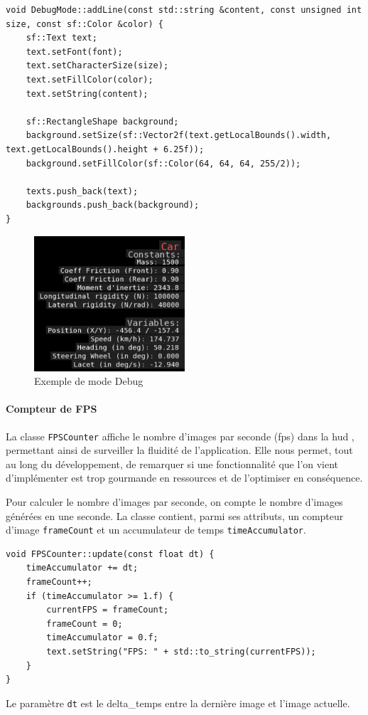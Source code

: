 \begin{lstlisting}[style=CStyle, label={lst:code_addline}]
void DebugMode::addLine(const std::string &content, const unsigned int size, const sf::Color &color) {
    sf::Text text;
    text.setFont(font);
    text.setCharacterSize(size);
    text.setFillColor(color);
    text.setString(content);

    sf::RectangleShape background;
    background.setSize(sf::Vector2f(text.getLocalBounds().width, text.getLocalBounds().height + 6.25f));
    background.setFillColor(sf::Color(64, 64, 64, 255/2));

    texts.push_back(text);
    backgrounds.push_back(background);
}
\end{lstlisting}
\begin{figure}[H]
    \centering
    \includegraphics[width=0.5\textwidth]{resources/example_debug_mode_1}
    \caption{Exemple de mode Debug}
    \label{fig:debug_mode}
\end{figure}

\paragraph{Compteur de FPS}
La classe \texttt{FPSCounter} affiche le nombre d'images par seconde (\gls{fps}) dans la \gls{hud} , permettant ainsi de surveiller la fluidité de l'application.
Elle nous permet, tout au long du développement, de remarquer si une fonctionnalité que l'on vient d'implémenter est trop gourmande en ressources et de l'optimiser en conséquence.

Pour calculer le nombre d'images par seconde, on compte le nombre d'images générées en une seconde.
La classe contient, parmi ses attributs, un compteur d'image \texttt{frameCount} et un accumulateur de temps \texttt{timeAccumulator}.
\begin{lstlisting}[style=CStyle, label={lst:code_fpscounter}]
void FPSCounter::update(const float dt) {
    timeAccumulator += dt;
    frameCount++;
    if (timeAccumulator >= 1.f) {
        currentFPS = frameCount;
        frameCount = 0;
        timeAccumulator = 0.f;
        text.setString("FPS: " + std::to_string(currentFPS));
    }
}
\end{lstlisting}
Le paramètre \texttt{dt} est le \gls{delta_temps} entre la dernière image et l'image actuelle.

